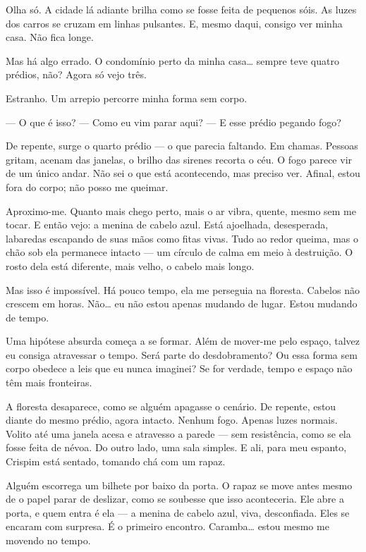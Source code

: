 Olha só. A cidade lá adiante brilha como se fosse feita de pequenos sóis. As luzes dos carros se cruzam em linhas pulsantes. E, mesmo daqui, consigo ver minha casa. Não fica longe.  

Mas há algo errado.  
O condomínio perto da minha casa… sempre teve quatro prédios, não?  
Agora só vejo três.  

Estranho.  
Um arrepio percorre minha forma sem corpo.

— O que é isso?  
— Como eu vim parar aqui?  
— E esse prédio pegando fogo?

De repente, surge o quarto prédio — o que parecia faltando. Em chamas. Pessoas gritam, acenam das janelas, o brilho das sirenes recorta o céu. O fogo parece vir de um único andar. Não sei o que está acontecendo, mas preciso ver.  
Afinal, estou fora do corpo; não posso me queimar.

Aproximo-me. Quanto mais chego perto, mais o ar vibra, quente, mesmo sem me tocar.  
E então vejo: a menina de cabelo azul. Está ajoelhada, desesperada, labaredas escapando de suas mãos como fitas vivas. Tudo ao redor queima, mas o chão sob ela permanece intacto — um círculo de calma em meio à destruição. O rosto dela está diferente, mais velho, o cabelo mais longo.  

Mas isso é impossível. Há pouco tempo, ela me perseguia na floresta.  
Cabelos não crescem em horas.  
Não… eu não estou apenas mudando de lugar. Estou mudando de tempo.

Uma hipótese absurda começa a se formar. Além de mover-me pelo espaço, talvez eu consiga atravessar o tempo.  
Será parte do desdobramento? Ou essa forma sem corpo obedece a leis que eu nunca imaginei?  
Se for verdade, tempo e espaço não têm mais fronteiras.  

A floresta desaparece, como se alguém apagasse o cenário.  
De repente, estou diante do mesmo prédio, agora intacto. Nenhum fogo. Apenas luzes normais.  
Volito até uma janela acesa e atravesso a parede — sem resistência, como se ela fosse feita de névoa.  
Do outro lado, uma sala simples. E ali, para meu espanto, Crispim está sentado, tomando chá com um rapaz.

Alguém escorrega um bilhete por baixo da porta. O rapaz se move antes mesmo de o papel parar de deslizar, como se soubesse que isso aconteceria. Ele abre a porta, e quem entra é ela — a menina de cabelo azul, viva, desconfiada.  
Eles se encaram com surpresa. É o primeiro encontro.  
Caramba… estou mesmo me movendo no tempo.

